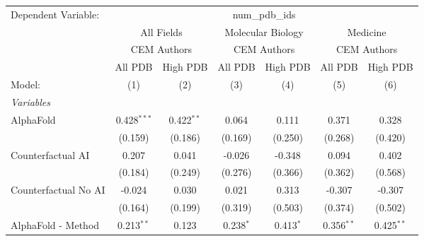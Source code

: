 \begingroup
\centering
\begin{tabular}{lcccccc}
   \tabularnewline \midrule \midrule
   Dependent Variable: & \multicolumn{6}{c}{num\_pdb\_ids}\\
 & \multicolumn{2}{c}{All Fields} & \multicolumn{2}{c}{Molecular Biology} & \multicolumn{2}{c}{Medicine} \\
\cmidrule(lr){2-3} \cmidrule(lr){4-5} \cmidrule(lr){6-7}
 & \multicolumn{2}{c}{CEM Authors} & \multicolumn{2}{c}{CEM Authors} & \multicolumn{2}{c}{CEM Authors} \\
\cmidrule(lr){2-3} \cmidrule(lr){4-5} \cmidrule(lr){6-7}
 & \multicolumn{1}{c}{All PDB} & \multicolumn{1}{c}{High PDB} & \multicolumn{1}{c}{All PDB} & \multicolumn{1}{c}{High PDB} & \multicolumn{1}{c}{All PDB} & \multicolumn{1}{c}{High PDB} \\
\cmidrule(lr){2-2} \cmidrule(lr){3-3} \cmidrule(lr){4-4} \cmidrule(lr){5-5} \cmidrule(lr){6-6} \cmidrule(lr){7-7}
   Model:                                                     & (1)            & (2)           & (3)          & (4)         & (5)           & (6)\\  
   \midrule
   \emph{Variables}\\
   AlphaFold                                                  & 0.428$^{***}$  & 0.422$^{**}$  & 0.064        & 0.111       & 0.371         & 0.328\\   
                                                              & (0.159)        & (0.186)       & (0.169)      & (0.250)     & (0.268)       & (0.420)\\   
   Counterfactual AI                                          & 0.207          & 0.041         & -0.026       & -0.348      & 0.094         & 0.402\\   
                                                              & (0.184)        & (0.249)       & (0.276)      & (0.366)     & (0.362)       & (0.568)\\   
   Counterfactual No AI                                       & -0.024         & 0.030         & 0.021        & 0.313       & -0.307        & -0.307\\   
                                                              & (0.164)        & (0.199)       & (0.319)      & (0.503)     & (0.374)       & (0.502)\\   
   AlphaFold - Method                                         & 0.213$^{**}$   & 0.123         & 0.238$^{*}$  & 0.413$^{*}$ & 0.356$^{**}$  & 0.425$^{**}$\\   

\end{tabular}
